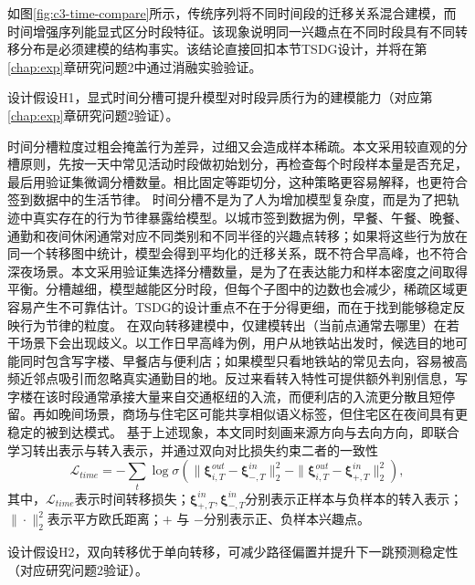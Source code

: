 如图\ref{fig:c3-time-compare}所示，传统序列将不同时间段的迁移关系混合建模，而时间增强序列能显式区分时段特征。该现象说明同一兴趣点在不同时段具有不同转移分布是必须建模的结构事实。该结论直接回扣本节TSDG设计，并将在第\ref{chap:exp}章研究问题2中通过消融实验验证。

{\heiti{}设计假设H1，}显式时间分槽可提升模型对时段异质行为的建模能力（对应第\ref{chap:exp}章研究问题2验证）。

时间分槽粒度过粗会掩盖行为差异，过细又会造成样本稀疏。本文采用较直观的分槽原则，先按一天中常见活动时段做初始划分，再检查每个时段样本量是否充足，最后用验证集微调分槽数量。相比固定等距切分，这种策略更容易解释，也更符合签到数据中的生活节律。
时间分槽不是为了人为增加模型复杂度，而是为了把轨迹中真实存在的行为节律暴露给模型。以城市签到数据为例，早餐、午餐、晚餐、通勤和夜间休闲通常对应不同类别和不同半径的兴趣点转移；如果将这些行为放在同一个转移图中统计，模型会得到平均化的迁移关系，既不符合早高峰，也不符合深夜场景。本文采用验证集选择分槽数量，是为了在表达能力和样本密度之间取得平衡。分槽越细，模型越能区分时段，但每个子图中的边数也会减少，稀疏区域更容易产生不可靠估计。TSDG的设计重点不在于分得更细，而在于找到能够稳定反映行为节律的粒度。
在双向转移建模中，仅建模转出（当前点通常去哪里）在若干场景下会出现歧义。以工作日早高峰为例，用户从地铁站出发时，候选目的地可能同时包含写字楼、早餐店与便利店；如果模型只看地铁站的常见去向，容易被高频近邻点吸引而忽略真实通勤目的地。反过来看转入特性可提供额外判别信息，写字楼在该时段通常承接大量来自交通枢纽的入流，而便利店的入流更分散且短停留。再如晚间场景，商场与住宅区可能共享相似语义标签，但住宅区在夜间具有更稳定的被到达模式。
基于上述现象，本文同时刻画来源方向与去向方向，即联合学习转出表示与转入表示，并通过双向对比损失约束二者的一致性
\begin{equation}
\mathcal{L}_{time}=-\sum_t\log\sigma\left(\|\boldsymbol{\xi}^{out}_{i,T}-\boldsymbol{\xi}^{in}_{-,T}\|_2^2-\|\boldsymbol{\xi}^{out}_{i,T}-\boldsymbol{\xi}^{in}_{+,T}\|_2^2\right),
\label{eq:c3-ltime}
\end{equation}
其中，$\mathcal{L}_{time}$表示时间转移损失；$\boldsymbol{\xi}^{in}_{+,T},\boldsymbol{\xi}^{in}_{-,T}$分别表示正样本与负样本的转入表示；$\|\cdot\|_2^2$表示平方欧氏距离；$+$ 与 $-$分别表示正、负样本兴趣点。

{\heiti{}设计假设H2，}双向转移优于单向转移，可减少路径偏置并提升下一跳预测稳定性（对应研究问题2验证）。

